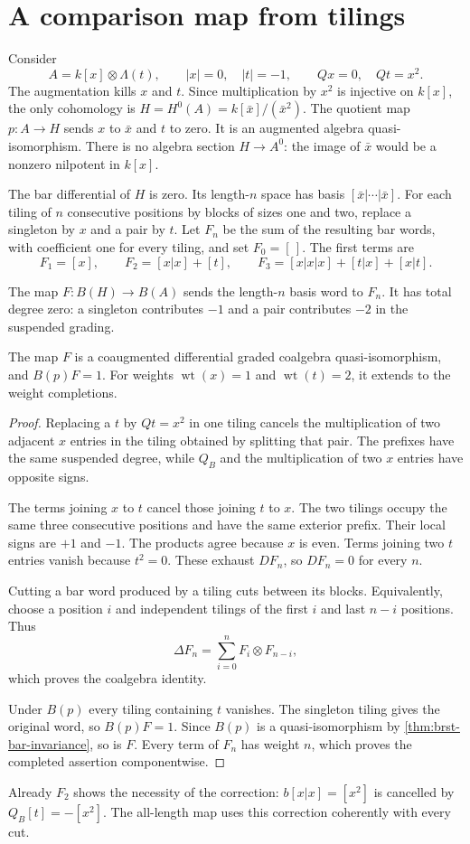 \section{A comparison map from tilings}
Consider
\[
 A=k[x]\otimes\Lambda(t),
 \qquad |x|=0,\quad |t|=-1,
 \qquad Qx=0,\quad Qt=x^2.
\]
The augmentation kills $x$ and $t$.
Since multiplication by $x^2$ is injective on $k[x]$,
the only cohomology is
$H=H^0(A)=k[\bar x]/(\bar x^2)$.
The quotient map $p:A\to H$ sends $x$ to $\bar x$ and $t$ to zero.
It is an augmented algebra quasi-isomorphism.
There is no algebra section $H\to A^0$: the image of $\bar x$
would be a nonzero nilpotent in $k[x]$.

The bar differential of $H$ is zero.
Its length-$n$ space has basis $[\bar x|\cdots|\bar x]$.
For each tiling of $n$ consecutive positions by blocks of sizes
one and two, replace a singleton by $x$ and a pair by $t$.
Let $F_n$ be the sum of the resulting bar words, with coefficient
one for every tiling, and set $F_0=[\,]$.
The first terms are
\[
 F_1=[x],\qquad F_2=[x|x]+[t],\qquad
 F_3=[x|x|x]+[t|x]+[x|t].
\]

The map $F:B(H)\to B(A)$ sends the length-$n$ basis word to $F_n$.
It has total degree zero: a singleton contributes $-1$ and a pair
contributes $-2$ in the suspended grading.

\begin{proposition}\label{prop:brst-tiling-map}
The map $F$ is a coaugmented differential graded coalgebra
quasi-isomorphism, and $B(p)F=1$.
For weights $\operatorname{wt}(x)=1$ and
$\operatorname{wt}(t)=2$, it extends to the weight completions.
\end{proposition}
\begin{proof}
Replacing a $t$ by $Qt=x^2$ in one tiling cancels the
multiplication of two adjacent $x$ entries in the tiling obtained
by splitting that pair.
The prefixes have the same suspended degree, while $Q_B$ and
the multiplication of two $x$ entries have opposite signs.

The terms joining $x$ to $t$ cancel those joining $t$ to $x$.
The two tilings occupy the same three consecutive positions
and have the same exterior prefix.
Their local signs are $+1$ and $-1$.
The products agree because $x$ is even.
Terms joining two $t$ entries vanish because $t^2=0$.
These exhaust $DF_n$, so $DF_n=0$ for every $n$.

Cutting a bar word produced by a tiling cuts between its blocks.
Equivalently, choose a position $i$ and independent tilings of
the first $i$ and last $n-i$ positions.
Thus
\[
 \Delta F_n=\sum_{i=0}^n F_i\otimes F_{n-i},
\]
which proves the coalgebra identity.

Under $B(p)$ every tiling containing $t$ vanishes.
The singleton tiling gives the original word, so $B(p)F=1$.
Since $B(p)$ is a quasi-isomorphism by
\cref{thm:brst-bar-invariance}, so is $F$.
Every term of $F_n$ has weight $n$, which proves the completed
assertion componentwise.
\end{proof}
Already $F_2$ shows the necessity of the correction:
$b[x|x]=[x^2]$ is cancelled by $Q_B[t]=-[x^2]$.
The all-length map uses this correction coherently with every cut.

